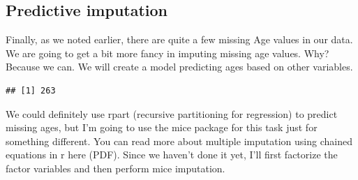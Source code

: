 \documentclass[]{book}
\newenvironment{Shaded}{\begin{snugshade}}{\end{snugshade}}
\newcommand{\KeywordTok}[1]{\textcolor[rgb]{0.13,0.29,0.53}{\textbf{#1}}}
\newcommand{\DataTypeTok}[1]{\textcolor[rgb]{0.13,0.29,0.53}{#1}}
\newcommand{\DecValTok}[1]{\textcolor[rgb]{0.00,0.00,0.81}{#1}}
\newcommand{\StringTok}[1]{\textcolor[rgb]{0.31,0.60,0.02}{#1}}
\newcommand{\CommentTok}[1]{\textcolor[rgb]{0.56,0.35,0.01}{\textit{#1}}}
\newcommand{\ControlFlowTok}[1]{\textcolor[rgb]{0.13,0.29,0.53}{\textbf{#1}}}
\newcommand{\OperatorTok}[1]{\textcolor[rgb]{0.81,0.36,0.00}{\textbf{#1}}}
\newcommand{\NormalTok}[1]{#1}
\theoremstyle{definition}
\theoremstyle{definition}
\theoremstyle{definition}
\theoremstyle{remark}
\begin{document}
\subsection{Predictive imputation}\label{predictive-imputation}

Finally, as we noted earlier, there are quite a few missing Age values
in our data. We are going to get a bit more fancy in imputing missing
age values. Why? Because we can. We will create a model predicting ages
based on other variables.

\begin{Shaded}
\end{Shaded}

\begin{verbatim}
## [1] 263
\end{verbatim}

We could definitely use rpart (recursive partitioning for regression) to
predict missing ages, but I'm going to use the mice package for this
task just for something different. You can read more about multiple
imputation using chained equations in r here (PDF). Since we haven't
done it yet, I'll first factorize the factor variables and then perform
mice imputation.

\begin{Shaded}
\end{Shaded}
\end{document}
